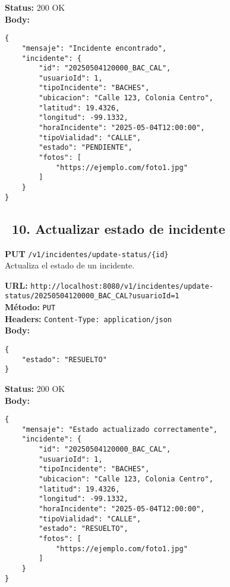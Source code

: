 \begin{tcolorbox}[response]
    \textbf{Status:} 200 OK\\
    \textbf{Body:}
    \begin{verbatim}
{
    "mensaje": "Incidente encontrado",
    "incidente": {
        "id": "20250504120000_BAC_CAL",
        "usuarioId": 1,
        "tipoIncidente": "BACHES",
        "ubicacion": "Calle 123, Colonia Centro",
        "latitud": 19.4326,
        "longitud": -99.1332,
        "horaIncidente": "2025-05-04T12:00:00",
        "tipoVialidad": "CALLE",
        "estado": "PENDIENTE",
        "fotos": [
            "https://ejemplo.com/foto1.jpg"
        ]
    }
}
    \end{verbatim}
\end{tcolorbox}

\subsection*{\faServer\ 10. Actualizar estado de incidente}
\begin{tcolorbox}[endpoint]
    \textbf{PUT} \texttt{/v1/incidentes/update-status/\{id\}}\\
    Actualiza el estado de un incidente.
\end{tcolorbox}

\begin{tcolorbox}[request]
    \textbf{URL:} \textcolor{urlColor}{\texttt{http://localhost:8080/v1/incidentes/update-status/20250504120000\_BAC\_CAL?usuarioId=1}}\\
    \textbf{Método:} \textcolor{methodColor}{\texttt{PUT}}\\
    \textbf{Headers:} \textcolor{headerColor}{\texttt{Content-Type: application/json}}\\
    \textbf{Body:}
    \begin{verbatim}
{
    "estado": "RESUELTO"
}
    \end{verbatim}
\end{tcolorbox}

\begin{tcolorbox}[response]
    \textbf{Status:} 200 OK\\
    \textbf{Body:}
    \begin{verbatim}
{
    "mensaje": "Estado actualizado correctamente",
    "incidente": {
        "id": "20250504120000_BAC_CAL",
        "usuarioId": 1,
        "tipoIncidente": "BACHES",
        "ubicacion": "Calle 123, Colonia Centro",
        "latitud": 19.4326,
        "longitud": -99.1332,
        "horaIncidente": "2025-05-04T12:00:00",
        "tipoVialidad": "CALLE",
        "estado": "RESUELTO",
        "fotos": [
            "https://ejemplo.com/foto1.jpg"
        ]
    }
}
    \end{verbatim}
\end{tcolorbox}

